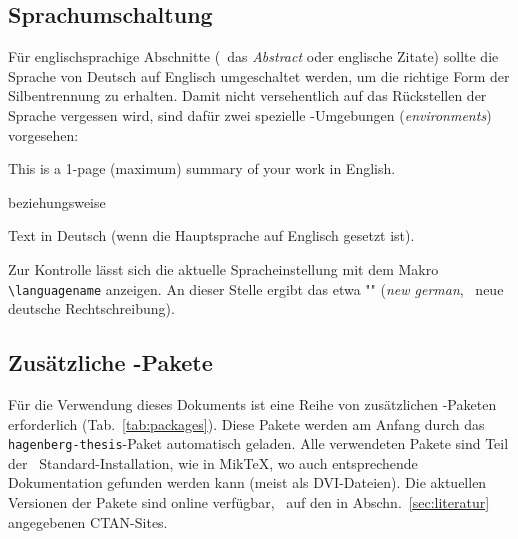 \subsection{Sprachumschaltung}
\label{sec:sprachumschaltung}

Für englischsprachige Abschnitte (\zB\ das \emph{Abstract} oder englische Zitate)
sollte die Sprache von Deutsch auf Englisch umgeschaltet werden, um
die richtige Form der Silbentrennung zu erhalten. Damit nicht versehentlich
auf das Rückstellen der Sprache vergessen wird, sind dafür zwei spezielle
\latex-Umgebungen (\emph{environments}) vorgesehen:
%
\begin{LaTeXCode}[numbers=none]
\begin{english}
	This is a 1-page (maximum) summary of your work in English.
\end{english}
\end{LaTeXCode}
%
beziehungsweise
%
\begin{LaTeXCode}[numbers=none]
\begin{german}
	Text in Deutsch (wenn die Hauptsprache auf Englisch gesetzt ist).
\end{german}
\end{LaTeXCode}
%
Zur Kontrolle lässt sich die aktuelle Spracheinstellung mit dem Makro
\verb!\languagename! anzeigen. An dieser Stelle ergibt das etwa
"\texttt{\languagename}" (\emph{new german}, \dah\ neue deutsche
Rechtschreibung).

\subsection{Zusätzliche {\latex}-Pakete}

Für die Verwendung dieses Dokuments ist eine Reihe von zusätzlichen
\latex-Paketen erforderlich (Tab.~\ref{tab:packages}). Diese Pakete werden am
Anfang durch das \texttt{hagenberg-thesis}-Paket automatisch geladen. Alle
verwendeten Pakete sind Teil der \latex\ Standard-Installation, wie \zB in
MikTeX, wo auch entsprechende Dokumentation gefunden werden kann (meist als
DVI-Dateien). Die aktuellen Versionen der Pakete sind online verfügbar, \ua\
auf den in Abschn.~\ref{sec:literatur} angegebenen CTAN-Sites.

